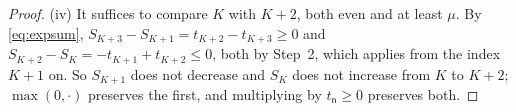 \begin{proof}
(iv) It suffices to compare $K$ with $K+2$, both even and at least $\mu$. By
\eqref{eq:expsum}, $S_{K+3}-S_{K+1}=t_{K+2}-t_{K+3}\ge0$ and
$S_{K+2}-S_K=-t_{K+1}+t_{K+2}\le0$, both by Step~2, which applies from the
index $K+1$ on. So $S_{K+1}$ does not decrease and $S_K$ does not increase
from $K$ to $K+2$; $\max(0,\cdot)$ preserves the first, and multiplying by
$t_{\mathsf{n}}\ge0$ preserves both.
\end{proof}
